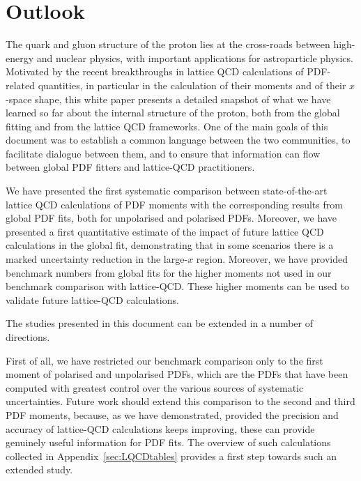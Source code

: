\section{Outlook}
\label{sec:outlook}

The quark and gluon structure of the proton lies
at the cross-roads between high-energy and nuclear physics, with important
applications for astroparticle physics.
%
Motivated by the recent breakthroughs in lattice QCD calculations of
PDF-related quantities, in particular in the calculation of their moments and 
of their $x$-space shape, this white paper presents a detailed snapshot of 
what we have learned so far about the internal structure of the proton, 
both from the global fitting and from the lattice QCD frameworks.
%
One of the main goals of this document was to establish a common language
between the two communities, to facilitate dialogue between them,
and to ensure that information can flow between global PDF fitters
and lattice-QCD practitioners.

We have presented the first systematic comparison between state-of-the-art 
lattice QCD calculations of PDF moments with the corresponding results from 
global PDF fits, both for unpolarised and polarised PDFs.
%
Moreover, we have presented a first quantitative estimate of the impact
of future lattice QCD calculations in the global fit, demonstrating that
in some scenarios there is a marked uncertainty reduction in the large-$x$ region.
%
Moreover, we have provided benchmark numbers
from global fits for the higher moments not used
in our benchmark comparison with lattice-QCD. These higher moments can be used
to validate future lattice-QCD calculations.

The studies presented in this document can be extended in a number of directions.

First of all, we have restricted our benchmark comparison only to the
first moment of polarised and unpolarised PDFs, which are the PDFs
that have been computed with greatest control over the various sources of
systematic uncertainties.
%
Future work should extend this comparison to the second and third PDF moments,
because, as we have demonstrated, provided the precision and accuracy
of lattice-QCD calculations keeps improving, these can provide genuinely
useful information for PDF fits.
%
The overview of such calculations collected in Appendix~\ref{sec:LQCDtables}
provides a first step towards such an extended study.

